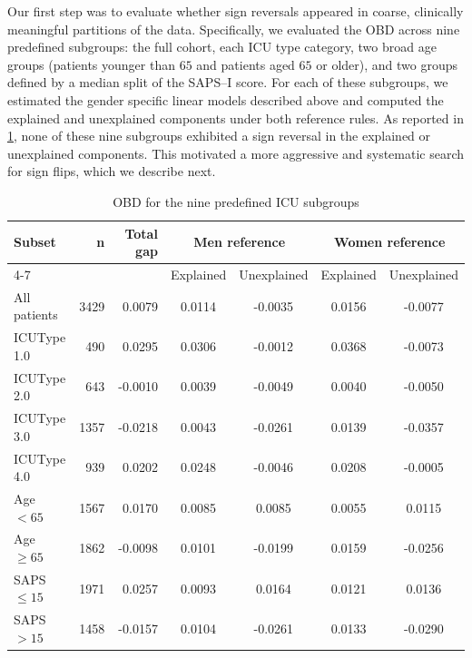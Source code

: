 Our first step was to evaluate whether sign reversals appeared in coarse, clinically meaningful partitions of the data. Specifically, we evaluated the OBD across nine predefined subgroups: the full cohort, each ICU type category, two broad age groups (patients younger than $65$ and patients aged $65$ or older), and two groups defined by a median split of the SAPS--I score. For each of these subgroups, we estimated the gender specific linear models described above and computed the explained and unexplained components under both reference rules. As reported in \cref{tab:A1_initial_subgroups}, none of these nine subgroups exhibited a sign reversal in the explained or unexplained components. This motivated a more aggressive and systematic search for sign flips, which we describe next.
\begin{table}[H]
    \centering
    \small
    \caption{OBD for the nine predefined ICU subgroups}
    \label{tab:A1_initial_subgroups}
    \begin{tabular}{l|r|r|cc|cc}
    \toprule
    Subset & n & Total gap
        & \multicolumn{2}{c|}{Men reference} 
        & \multicolumn{2}{c}{Women reference} \\ 
    \cline{4-7}
      &   &   
      & Explained & Unexplained
      & Explained & Unexplained \\
      \midrule
    All patients    & 3429 &  0.0079 &  0.0114 & -0.0035 &  0.0156 & -0.0077 \\ 
    ICUType 1.0     &  490 &  0.0295 &  0.0306 & -0.0012 &  0.0368 & -0.0073 \\ 
    ICUType 2.0     &  643 & -0.0010 &  0.0039 & -0.0049 &  0.0040 & -0.0050 \\ 
    ICUType 3.0     & 1357 & -0.0218 &  0.0043 & -0.0261 &  0.0139 & -0.0357 \\ 
    ICUType 4.0     &  939 &  0.0202 &  0.0248 & -0.0046 &  0.0208 & -0.0005 \\ 
    Age $< 65$      & 1567 &  0.0170 &  0.0085 &  0.0085 &  0.0055 &  0.0115 \\ 
    Age $\ge 65$    & 1862 & -0.0098 &  0.0101 & -0.0199 &  0.0159 & -0.0256 \\ 
    SAPS $\le 15$   & 1971 &  0.0257 &  0.0093 &  0.0164 &  0.0121 &  0.0136 \\ 
    SAPS $> 15$     & 1458 & -0.0157 &  0.0104 & -0.0261 &  0.0133 & -0.0290 \\
    \bottomrule
    \end{tabular}
\end{table}


